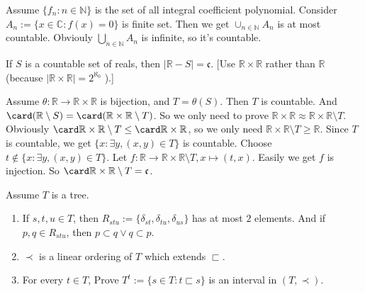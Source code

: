 \documentclass{ctexart}
\begin{document}
\begin{solution}
  Assume \(\{f_n:n \in \mathbb{N}\}\) is the set of all integral coefficient polynomial.
  Consider \(A_n:=\{x \in \mathbb{C}:f(x)=0\}\) is finite set. Then we get \(\cup_{n \in \mathbb{N}}A_n\) is at most countable. 
  Obviouly \(\bigcup_{n \in \mathbb{N} } A_n\) is infinite, so it's countable. 
\end{solution}
\begin{problem}
If $S$ is a countable set of reals, then $|\mathbb{R}-S|=\mathfrak{c}$.
[Use $\mathbb{R} \times \mathbb{R}$ rather than $\mathbb{R}$ (because $|\mathbb{R} \times \mathbb{R}|=2^{\aleph_0}$ ).]
\end{problem}

\begin{solution}
  Assume \(\theta:\mathbb{R} \to \mathbb{R} \times \mathbb{R}\) is bijection, and \(T=\theta(S)\). 
  Then \(T\) is countable. And \(\card (\mathbb{R}\setminus S)= \card (\mathbb{R} \times \mathbb{R} \setminus T)\). 
  So we only need to prove \(\mathbb{R}\times \mathbb{R} \approx \mathbb{R} \times \mathbb{R} \setminus T\). 
  Obviously \(\card \mathbb{R}\times \mathbb{R} \setminus T \leq \card \mathbb{R} \times \mathbb{R}\), so we only need
  \(\mathbb{R}\times \mathbb{R} \setminus T \geq \mathbb{R}\). 
  Since \(T\) is countable, we get \(\{x:\exists y,(x,y) \in T\}\) is countable. 
  Choose \(t \notin \{x:\exists y,(x,y) \in T\}\). 
  Let \(f:\mathbb{R} \to \mathbb{R} \times \mathbb{R} \setminus T,x \mapsto (t,x)\). 
  Easily we get \(f\) is injection. So \(\card \mathbb{R} \times \mathbb{R} \setminus T=\mathfrak{c}\). 
\end{solution}

\begin{problem}
  Assume \(T\) is a tree. 
  \begin{enumerate}[ref=\theproblem.\arabic*]
    \item \label{it:1}If \(s,t,u \in T\), then \(R_{stu} :=\{\delta_{st} ,\delta_{tu} ,\delta_{us} \}\) has at most \(2\) elements. 
      And if \(p,q \in R_{stu}\), then \(p \subset q \vee q \subset p\). 
    \item \label{it:2}\(\prec \) is a linear ordering of \(T\) which extends \(\sqsubset\). 
    \item For every \(t \in T\), Prove \(T^t:=\{s \in T:t \sqsubset s\}\) is an interval in \((T,\prec)\). 
  \end{enumerate}
\end{problem}
\end{document}

